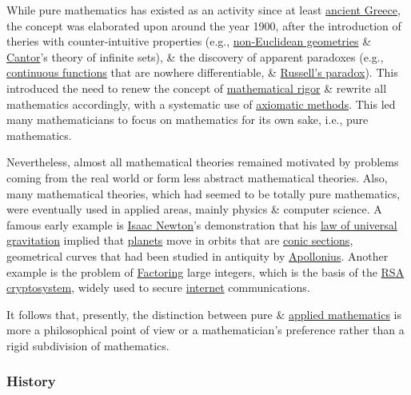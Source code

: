\documentclass{article}
\begin{document}
While pure mathematics has existed as an activity since at least \href{https://en.wikipedia.org/wiki/Ancient_Greece}{ancient Greece}, the concept was elaborated upon around the year 1900, after the introduction of theries with counter-intuitive properties (e.g., \href{https://en.wikipedia.org/wiki/Non-Euclidean_geometries}{non-Euclidean geometries} \& \href{https://en.wikipedia.org/wiki/Georg_Cantor}{\sc Cantor}'s theory of infinite sets), \& the discovery of apparent paradoxes (e.g., \href{https://en.wikipedia.org/wiki/Continuous_function}{continuous functions} that are nowhere differentiable, \& \href{https://en.wikipedia.org/wiki/Russell%27s_paradox}{Russell's paradox}). This introduced the need to renew the concept of \href{https://en.wikipedia.org/wiki/Mathematical_rigor}{mathematical rigor} \& rewrite all mathematics accordingly, with a systematic use of \href{https://en.wikipedia.org/wiki/Axiomatic_method}{axiomatic methods}. This led many mathematicians to focus on mathematics for its own sake, i.e., pure mathematics.

Nevertheless, almost all mathematical theories remained motivated by problems coming from the real world or form less abstract mathematical theories. Also, many mathematical theories, which had seemed to be totally pure mathematics, were eventually used in applied areas, mainly physics \& computer science. A famous early example is \href{https://en.wikipedia.org/wiki/Isaac_Newton}{\sc Isaac Newton}'s demonstration that his \href{https://en.wikipedia.org/wiki/Law_of_universal_gravitation}{law of universal gravitation} implied that \href{https://en.wikipedia.org/wiki/Planet}{planets} move in orbits that are \href{https://en.wikipedia.org/wiki/Conic_section}{conic sections}, geometrical curves that had been studied in antiquity by \href{https://en.wikipedia.org/wiki/Apollonius_of_Perga}{\sc Apollonius}. Another example is the problem of \href{https://en.wikipedia.org/wiki/Factorization}{Factoring} large integers, which is the basis of the \href{https://en.wikipedia.org/wiki/RSA_cryptosystem}{RSA cryptosystem}, widely used to secure \href{https://en.wikipedia.org/wiki/Internet}{internet} communications.

It follows that, presently, the distinction between pure \& \href{https://en.wikipedia.org/wiki/Applied_mathematics}{applied mathematics} is more a philosophical point of view or a mathematician's preference rather than a rigid subdivision of mathematics.

\subsubsection{History}
\end{document}
